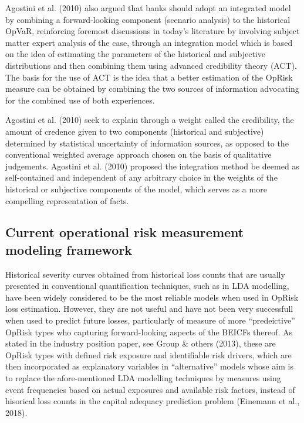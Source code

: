 \documentclass{DissertateUSU}
\begin{document}
Agostini et al. (2010) also argued that banks should adopt an integrated
model by combining a forward-looking component (scenario analysis) to
the historical OpVaR, reinforcing foremost discussions in today's
literature by involving subject matter expert analysis of the case,
through an integration model which is based on the idea of estimating
the parameters of the historical and subjective distributions and then
combining them using advanced credibility theory (ACT). The basis for
the use of ACT is the idea that a better estimation of the OpRisk
measure can be obtained by combining the two sources of information
advocating for the combined use of both experiences.\medskip

Agostini et al. (2010) seek to explain through a weight called the
credibility, the amount of credence given to two components (historical
and subjective) determined by statistical uncertainty of information
sources, as opposed to the conventional weighted average approach chosen
on the basis of qualitative judgements. Agostini et al. (2010) proposed
the integration method be deemed as self-contained and independent of
any arbitrary choice in the weights of the historical or subjective
components of the model, which serves as a more compelling
representation of facts.

\subsection{Current operational risk measurement modeling framework}
\label{sec:Current operational risk measurement modeling framework}

Historical severity curves obtained from historical loss counts that are
usually presented in conventional quantification techniques, such as in
LDA modelling, have been widely considered to be the most reliable
models when used in OpRisk loss estimation. However, they are not useful
and have not been very successfull when used to predict future losses,
particularly of measure of more ``predeictive'' OpRisk types who
capturing forward-looking aspects of the BEICFs thereof. As stated in
the industry position paper, see Group \& others (2013), these are
OpRisk types with defined risk exposure and identifiable risk drivers,
which are then incorporated as explanatory variables in ``alternative''
models whose aim is to replace the afore-mentioned LDA modelling
techniques by measures using event frequencies based on actual exposures
and available risk factors, instead of hisorical loss counts in the
capital adequacy prediction problem (Einemann et al., 2018).
\end{document}
